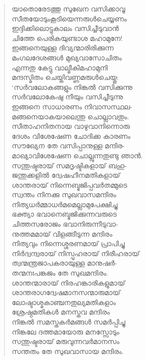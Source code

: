 \begin{verse}
യാതൊരേടത്തു സുഖേന വസിക്കാവൂ\\
സീതയോടുംകൂടിയെന്നരുള്‍ചെയ്യണം\\
ഇദ്ദിക്കിലൊട്ടുകാലം വസിച്ചീടുവാന്‍\\
ചിത്തേ പെരികയുണ്ടാശ മഹാമുനേ!\\
ഇങ്ങനെയുള്ള ദിവ്യന്മാരിരിക്കുന്ന\\
മംഗലദേശങ്ങള്‍ മുഖ്യവാസോചിതം\\
എന്നതു കേട്ടു വാല്മീകിമഹാമുനി\\
മന്ദസ്മിതം ചെയ്തിവണ്ണമരുള്‍ചെയ്തു:\\
‘സര്‍വലോകങ്ങളും നിങ്കല്‍ വസിക്കുന്നു\\
സര്‍വലോകേഷു നീയും വസിച്ചീടുന്നു\\
ഇങ്ങനെ സാധാരണം നിവാസസ്ഥല-\\
മങ്ങനെയാകയാലെന്തു ചൊല്ലാവതും.\\
സീതാഹനിതനായ വാഴുവാനിന്നൊരു\\
ദേശം വിശേഷേണ ചോദിക്ക കാരണം\\
സൗഖ്യേന തേ വസിപ്പാനുള്ള മന്ദിര-\\
മാഖ്യാവിശേഷേണ ചൊല്ലുന്നതുണ്ടു ഞാന്‍.\\
സന്തുഷ്ടരായ് സമദൃഷ്ടികളായ് ബഹു-\\
ജന്തുക്കളില്‍ ദ്വേഷഹീനമതികളായ്\\
ശാന്തരായ് നിന്നെബ്ഭജിപ്പവര്‍തമ്മുടെ\\
സ്വന്തം നിനക്കു സുഖവാസമന്ദിരം\\
നിത്യധര്‍മ്മാധര്‍മമെല്ലാമുപേക്ഷിച്ചു\\
ഭക്ത്യാ ഭവാനെബ്ഭജിക്കുന്നവരുടെ\\
ചിത്തസരോജം ഭവാനിരുന്നീടുവാ-\\
നുത്തമമായ് വിളങ്ങീടുന്ന മന്ദിരം\\
നിത്യവും നിന്നെശ്ശരണമായ് പ്രാപിച്ചു\\
നിര്‍ദ്വന്ദ്വരായ് നിസ്പൃഹരായ് നിരീഹരായ്\\
ത്വന്മന്ത്രജാപകരായുള്ള മാനുഷര്‍-\\
തന്മനഃപങ്കജം തേ സുഖമന്ദിരം.\\
ശാന്തന്മാരായ് നിരഹങ്കാരികളുമായ്\\
ശാന്തരാഗദ്വേഷമാനസന്മാരുമായ്\\
ലോഷ്ടാശ്മകാഞ്ചനതുല്യമതികളാം\\
ശ്രേഷ്ഠമതികള്‍ മനസ്തവ മന്ദിരം\\
നിങ്കല്‍ സമസ്തകര്‍മങ്ങള്‍ സമര്‍പ്പിച്ചു\\
നിങ്കലേ ദത്തമായോരു മനസ്സോടും\\
സന്തുഷ്ടരായ് മരുവുന്നവര്‍മാനസം\\
സന്തതം തേ സുഖവാസായ മന്ദിരം.\\

\end{verse}
